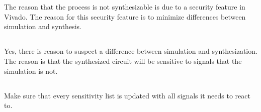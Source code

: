 \documentclass{article}
\begin{document}
\section{}
\subsection{}
The reason that the process is not synthesizable is due to a security
feature in Vivado. The reason for this security feature is to minimize
differences between simulation and synthesis.

\subsection{}
Yes, there is reason to suspect a difference between simulation and
synthesization. The reason is that the synthesized circuit will be
sensitive to signals that the simulation is not.

\subsection{}
Make sure that every sensitivity list is updated with all signals it
needs to react to.
\end{document}
